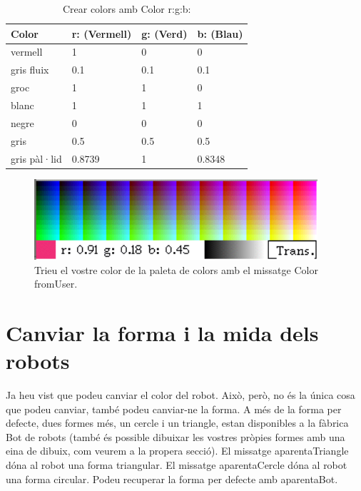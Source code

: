 \noindent
\begin{table}[h!]
\caption{Crear colors amb \textsf{\upshape Color r:g:b:}}
\label{tab0601}
\begin{center}
{\small \begin{tabular}{p{20mm}p{20mm}p{20mm}p{20mm}}
\hline
{\small \textbf{Color}} & {\small \textbf{r: (Vermell)}} & {\small \textbf{g: (Verd)}} & {\small \textbf{b: (Blau)}}\\
\hline
{\small vermell} & {\small 1} & {\small 0} & {\small 0}\\
{\small gris fluix} & {\small 0.1} & {\small 0.1} & {\small 0.1}\\
{\small groc} & {\small 1} & {\small 1} & {\small 0}\\
{\small blanc} & {\small 1} & {\small 1} & {\small 1}\\
{\small negre} & {\small 0} & {\small 0} & {\small 0}\\
{\small gris} & {\small 0.5} & {\small 0.5} & {\small 0.5}\\
{\small gris pàl·lid} & {\small 0.8739} & {\small 1} & {\small 0.8348}\\
\hline
\end{tabular}}
\end{center}
\end{table}

\begin{figure}[h!]
\begin{center}
\includegraphics[height=30mm ,width=105mm ]{Imatges/figura6-2.png}
\end{center}
\caption{Trieu el vostre color de la paleta de colors amb el missatge \textsf{\upshape Color fromUser}.}
\label{fig0602}
\end{figure}


\section{Canviar la forma i la mida dels robots}
Ja heu vist que podeu canviar el color del robot. Això, però, no és la única cosa que podeu canviar, també podeu canviar-ne la forma. A més de la forma per defecte, dues formes més, un cercle i un triangle, estan disponibles a la fàbrica \textsf{Bot} de robots (també és possible dibuixar les vostres pròpies formes amb una eina de dibuix, com veurem a la propera secció). El missatge \textsf{aparentaTriangle} dóna al robot una forma triangular. El missatge \textsf{aparentaCercle} dóna al robot una forma circular. Podeu recuperar la forma per defecte amb \textsf{aparentaBot}.

